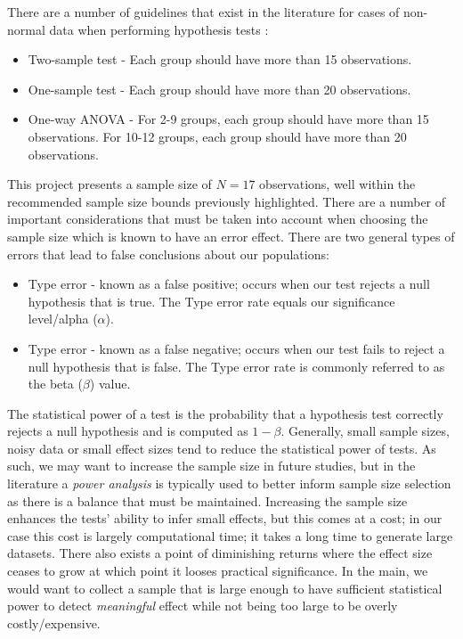 \documentclass{report}
\newcommand{\rom}[1]{\uppercase\expandafter{\romannumeral #1\relax}}
\begin{document}
There are a number of guidelines that exist in the literature for cases of non-normal data when performing hypothesis tests \cite{MTGuides}:
\begin{itemize}
	\item Two-sample test - Each group should have more than 15 observations.
	\item One-sample test - Each group should have more than 20 observations.
	\item One-way ANOVA - For 2-9 groups, each group should have more than 15 observations. For 10-12 groups, each group should have more than 20 observations.
\end{itemize}

This project presents a sample size of $N=17$ observations, well within the recommended sample size bounds previously highlighted. There are a number of important considerations that must be taken into account when choosing the sample size which is known to have an error effect. There are two general types of errors that lead to false conclusions about our populations:
\begin{itemize}
	\item Type \rom{1} error - known as a false positive; occurs when our test rejects a null hypothesis that is true. The Type \rom{1} error rate equals our significance level/alpha ($\alpha$).
	\item Type \rom{2} error - known as a false negative; occurs when our test fails to reject a null hypothesis that is false. The Type \rom{2} error rate is commonly referred to as the beta ($\beta$) value.
\end{itemize}

The statistical power of a test is the probability that a hypothesis test correctly rejects a null hypothesis and is computed as $1 - \beta$. Generally, small sample sizes, noisy data or small effect sizes tend to reduce the statistical power of tests. As such, we may want to increase the sample size in future studies, but in the literature a \textit{power analysis} is typically used to better inform sample size selection as there is a balance that must be maintained. Increasing the sample size enhances the tests' ability to infer small effects, but this comes at a cost; in our case this cost is largely computational time; it takes a long time to generate large datasets. There also exists a point of diminishing returns where the effect size ceases to grow at which point it looses practical significance. In the main, we would want to collect a sample that is large enough to have sufficient statistical power to detect \textit{meaningful} effect while not being too large to be overly costly/expensive.
\end{document}
